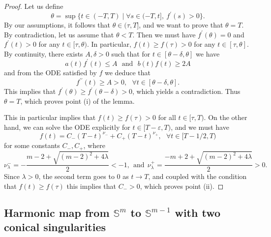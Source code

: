 \documentclass{article}
\numberwithin{equation}{section}        %
\theoremstyle{bfnote}
\theoremstyle{definition}
\theoremstyle{bfremark}
\newcommand{\Sp}{\mathbb{S}}                %
\begin{document}
\begin{proof}
    Let us define 
    \begin{equation*}
        \theta = \sup \{ t \in (-T,T) \mid \forall s \in (-T, t], ~ f^\prime(s) > 0 \} .
    \end{equation*}
    By our assumptions, it follows that $\theta \in (\tau, T]$, and we want to prove that $\theta = T$. By contradiction, let us assume that $\theta < T$. Then we must have $f^\prime(\theta) = 0$ and $f^\prime(t) > 0$ for any $t \in [\tau,\theta)$. In particular, $f(t) \geq f(\tau) > 0$ for any $t \in [\tau,\theta]$. By continuity, there exists $A, \delta > 0$ such that for $t \in [\theta-\delta,\theta]$ we have
    \begin{equation*}
        a(t) f^\prime(t) \leq A ~~~ \text{and} ~~~ b(t) f(t) \geq 2A
    \end{equation*}
    and from the ODE satisfied by $f$ we deduce that
    \begin{equation*}
        f^{\prime\prime}(t) \geq A > 0, ~~~ \forall t \in [\theta-\delta, \theta] .
    \end{equation*}
    This implies that $f^\prime(\theta) \geq f^\prime(\theta-\delta) > 0$, which yields a contradiction. Thus $\theta= T$, which proves point (i) of the lemma.

    This in particular implies that $f(t) \geq f(\tau) > 0$ for all $t \in [\tau,T)$. On the other hand, we can solve the ODE explicitly for $t \in [T-\varepsilon,T)$, and we must have
    \begin{equation*}
        f(t) = C_- (T-t)^{\nu_-} + C_+ (T-t)^{\nu_+}, ~~~ \forall t \in [T-1/2,T)
    \end{equation*}
    for some constants $C_-,C_+$, where
    \begin{equation*}
        \nu^-_\lambda = - \frac{m-2+ \sqrt{(m-2)^2+4\lambda}}{2} < -1 , ~~ \text{and} ~~ \nu^+_\lambda = \frac{-m+2 + \sqrt{(m-2)^2+4\lambda}}{2} > 0 .
    \end{equation*}
    Since $\lambda > 0$, the second term goes to $0$ as $t \rightarrow T$, and coupled with the condition that $f(t) \geq f(\tau)$ this implies that $C_- > 0$, which proves point (ii).
\end{proof}


    \subsection{Harmonic map from $\Sp^m$ to $\Sp^{m-1}$ with two conical singularities}        \label{subsec: map S^m to S^{m-1}}
\end{document}
